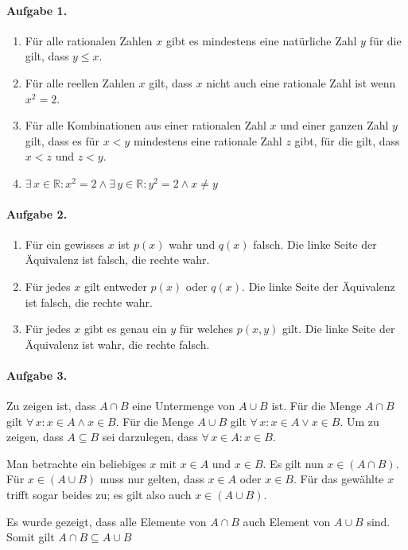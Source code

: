 \documentclass{article}
\begin{document}
\paragraph{Aufgabe 1.}

\begin{enumerate}[label=\alph*)]
    \item Für alle rationalen Zahlen $x$ gibt es mindestens eine natürliche Zahl $y$ für die gilt, dass $y \leq x$.
    
    \item Für alle reellen Zahlen $x$ gilt, dass $x$ nicht auch eine rationale Zahl ist wenn $x^2 = 2$.
    
    \item Für alle Kombinationen aus einer rationalen Zahl $x$ und einer ganzen Zahl $y$ gilt, dass es für $x < y$ mindestens eine rationale Zahl $z$ gibt, für die gilt, dass $x < z$ und $z < y$.
    
    \item $\exists\, x \in \mathbb{R} : x^2 = 2 \land \exists\, y \in \mathbb{R} : y^2 = 2 \land x \neq y$
\end{enumerate}

\paragraph{Aufgabe 2.}

\begin{enumerate}[label=\alph*)]
    \item Für ein gewisses $x$ ist $p(x)$ wahr und $q(x)$ falsch. Die linke Seite der Äquivalenz ist falsch, die rechte wahr.
    
    \item Für jedes $x$ gilt entweder $p(x)$ oder $q(x)$. Die linke Seite der Äquivalenz ist falsch, die rechte wahr.
    
    \item Für jedes $x$ gibt es genau ein $y$ für welches $p(x, y)$ gilt. Die linke Seite der Äquivalenz ist wahr, die rechte falsch.
\end{enumerate}

\paragraph{Aufgabe 3.} Zu zeigen ist, dass $A \cap B$ eine Untermenge von $A \cup B$ ist. Für die Menge $A \cap B$ gilt $\forall\,x : x \in A \land x \in B$. Für die Menge $A \cup B$ gilt $\forall\,x : x \in A \lor x \in B$. Um zu zeigen, dass $A \subseteq B$ sei darzulegen, dass $\forall\, x \in A : x \in B$.

Man betrachte ein beliebiges $x$ mit $x \in A$ und $x \in B$. Es gilt nun $x \in (A \cap B)$. Für $x \in (A \cup B)$ muss nur gelten, dass $x \in A$ oder $x \in B$. Für das gewählte $x$ trifft sogar beides zu; es gilt also auch $x \in (A \cup B)$.

Es wurde gezeigt, dass alle Elemente von $A \cap B$ auch Element von $A \cup B$ sind. Somit gilt $A \cap B \subseteq A \cup B$
\end{document}

